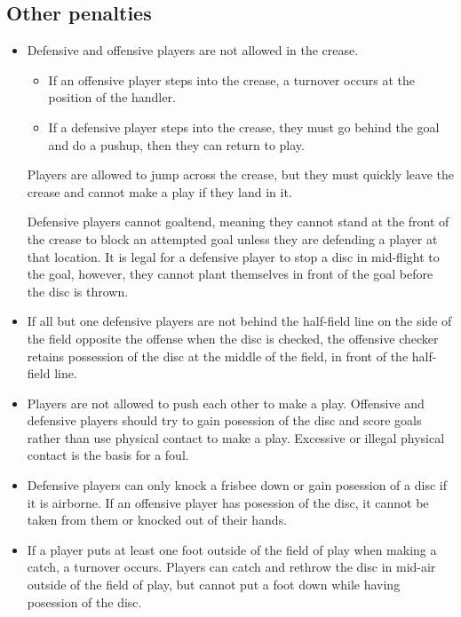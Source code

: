 \documentclass[10pt]{article}
\begin{document}
\subsection{Other penalties}
\begin{itemize}
    \item Defensive and offensive players are not allowed in the crease.
        \begin{itemize}
            \item If an offensive player steps into the crease, a turnover occurs at the position of the handler.
            \item If a defensive player steps into the crease, they must go behind the goal and do a pushup, then they can return to play.
        \end{itemize}
        Players are allowed to jump across the crease, but they must quickly leave the crease and cannot make a play if they land in it.

        Defensive players cannot goaltend, meaning they cannot stand at the front of the crease to block an attempted goal unless they are defending a player at that location. It is legal for a defensive player to stop a disc in mid-flight to the goal, however, they cannot plant themselves in front of the goal before the disc is thrown. 
    \item If all but one defensive players are not behind the half-field line on the side of the field opposite the offense when the disc is checked, the offensive checker retains possession of the disc at the middle of the field, in front of the half-field line.
    \item Players are not allowed to push each other to make a play. Offensive and defensive players should try to gain posession of the disc and score goals rather than use physical contact to make a play. Excessive or illegal physical contact is the basis for a foul.
    \item Defensive players can only knock a frisbee down or gain posession of a disc if it is airborne. If an offensive player has posession of the disc, it cannot be taken from them or knocked out of their hands.
    \item If a player puts at least one foot outside of the field of play when making a catch, a turnover occurs. Players can catch and rethrow the disc in mid-air outside of the field of play, but cannot put a foot down while having posession of the disc.
\end{itemize}
\end{document}
